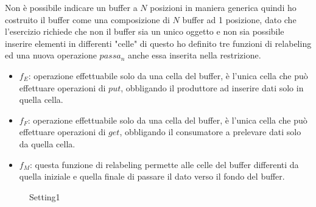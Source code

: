 \documentclass[a4paper]{article}
\begin{document}
Non è possibile indicare un buffer a $N$ posizioni in maniera generica quindi ho costruito il buffer come una composizione di $N$ buffer ad 1 posizione, dato che l'esercizio richiede che non il buffer sia un unico oggetto e non sia possibile inserire elementi in differenti "celle" di questo ho definito tre funzioni di relabeling ed una nuova operazione $passa_n$ anche essa inserita nella restrizione.
\newpage
\begin{itemize}
	\item $f_E$: operazione effettuabile solo da una cella del buffer, è l'unica cella che può effettuare operazioni di $put$, obbligando il produttore ad inserire dati solo in quella cella.
	\item $f_F$: operazione effettuabile solo da una cella del buffer, è l'unica cella che può effettuare operazioni di $get$, obbligando il consumatore a prelevare dati solo da quella cella.
	\item $f_M$: questa funzione di relabeling permette alle celle del buffer differenti da quella iniziale e quella finale di passare il dato verso il fondo del buffer.
\end{itemize}
\begin{figure}[!ht]
\centering
{}
\caption{Setting1} \label{FIG:PA1_DG}
\end{figure}
\end{document}
